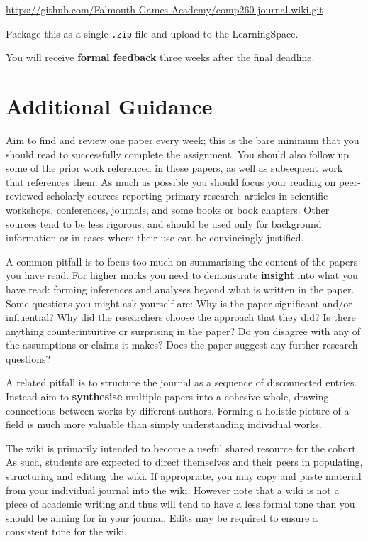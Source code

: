 \documentclass{../../fal_assignment}
\begin{document}
\url{https://github.com/Falmouth-Games-Academy/comp260-journal.wiki.git}

Package this as a single \texttt{.zip} file and upload to the LearningSpace.

You will receive \textbf{formal feedback} three weeks after the final deadline.

\section*{Additional Guidance}

Aim to find and review one paper every week; this is the bare minimum that you should read to successfully complete the assignment.
You should also follow up some of the prior work referenced in these papers,
as well as subsequent work that references them.
As much as possible you should focus your reading on peer-reviewed scholarly sources reporting primary research:
articles in scientific workshops, conferences, journals, and some books or book chapters.
Other sources tend to be less rigorous, and should be used only for background information
or in cases where their use can be convincingly justified.

A common pitfall is to focus too much on summarising the content of the papers you have read.
For higher marks you need to demonstrate \textbf{insight} into what you have read:
forming inferences and analyses beyond what is written in the paper.
Some questions you might ask yourself are:
Why is the paper significant and/or influential?
Why did the researchers choose the approach that they did?
Is there anything counterintuitive or surprising in the paper?
Do you disagree with any of the assumptions or claims it makes?
Does the paper suggest any further research questions?

A related pitfall is to structure the journal as a sequence of disconnected entries.
Instead aim to \textbf{synthesise} multiple papers into a cohesive whole,
drawing connections between works by different authors.
Forming a holistic picture of a field is much more valuable than simply understanding individual works.

The wiki is primarily intended to become a useful shared resource for the cohort.
As such, students are expected to direct themselves and their peers in populating, structuring and editing the wiki.
If appropriate, you may copy and paste material from your individual journal into the wiki.
However note that a wiki is not a piece of academic writing
and thus will tend to have a less formal tone than you should be aiming for in your journal.
Edits may be required to ensure a consistent tone for the wiki.
\end{document}
